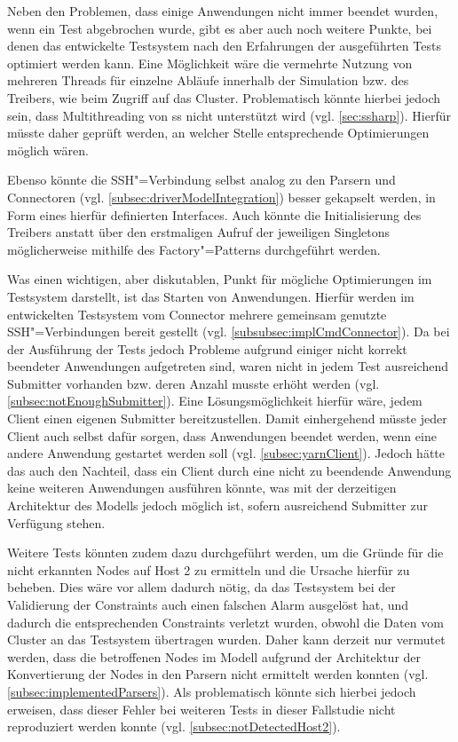 Neben den Problemen, dass einige Anwendungen nicht immer beendet wurden, wenn ein Test abgebrochen wurde, gibt es aber auch noch weitere Punkte, bei denen das entwickelte Testsystem nach den Erfahrungen der ausgeführten Tests optimiert werden kann.
Eine Möglichkeit wäre \zB die vermehrte Nutzung von mehreren Threads für einzelne Abläufe innerhalb der Simulation bzw. des Treibers, wie beim Zugriff auf das Cluster.
Problematisch könnte hierbei jedoch sein, dass Multithreading von \gls{ss} nicht unterstützt wird (vgl. \cref{sec:ssharp}).
Hierfür müsste daher geprüft werden, an welcher Stelle entsprechende Optimierungen möglich wären.

Ebenso könnte die SSH"=Verbindung selbst analog zu den Parsern und Connectoren (vgl. \cref{subsec:driverModelIntegration}) besser gekapselt werden, \zB in Form eines hierfür definierten Interfaces.
Auch könnte die Initialisierung des Treibers anstatt über den erstmaligen Aufruf der jeweiligen Singletons möglicherweise mithilfe des Factory"=Patterns durchgeführt werden.

Was einen wichtigen, aber diskutablen, Punkt für mögliche Optimierungen im Testsystem darstellt, ist das Starten von Anwendungen.
Hierfür werden im entwickelten Testsystem vom Connector mehrere gemeinsam genutzte SSH"=Verbindungen bereit gestellt (vgl. \cref{subsubsec:implCmdConnector}).
Da bei der Ausführung der Tests jedoch Probleme aufgrund einiger nicht korrekt beendeter Anwendungen aufgetreten sind, waren nicht in jedem Test ausreichend Submitter vorhanden bzw. deren Anzahl musste erhöht werden (vgl. \cref{subsec:notEnoughSubmitter}).
Eine Lösungsmöglichkeit hierfür wäre, jedem Client einen eigenen Submitter bereitzustellen.
Damit einhergehend müsste jeder Client auch selbst dafür sorgen, dass Anwendungen beendet werden, wenn eine andere Anwendung gestartet werden soll (vgl. \cref{subsec:yarnClient}).
Jedoch hätte das auch den Nachteil, dass ein Client durch eine nicht zu beendende Anwendung keine weiteren Anwendungen ausführen könnte, was mit der derzeitigen Architektur des Modells jedoch möglich ist, sofern ausreichend Submitter zur Verfügung stehen.

Weitere Tests könnten zudem dazu durchgeführt werden, um die Gründe für die nicht erkannten Nodes auf Host 2 zu ermitteln und die Ursache hierfür zu beheben.
Dies wäre vor allem dadurch nötig, da das Testsystem bei der Validierung der Constraints auch einen falschen Alarm ausgelöst hat, und dadurch die entsprechenden Constraints verletzt wurden, obwohl die Daten vom Cluster an das Testsystem übertragen wurden.
Daher kann derzeit nur vermutet werden, dass die betroffenen Nodes im Modell aufgrund der Architektur der Konvertierung der Nodes in den Parsern nicht ermittelt werden konnten (vgl. \cref{subsec:implementedParsers}).
Als problematisch könnte sich hierbei jedoch erweisen, dass dieser Fehler bei weiteren Tests in dieser Fallstudie nicht reproduziert werden konnte (vgl. \cref{subsec:notDetectedHost2}).

